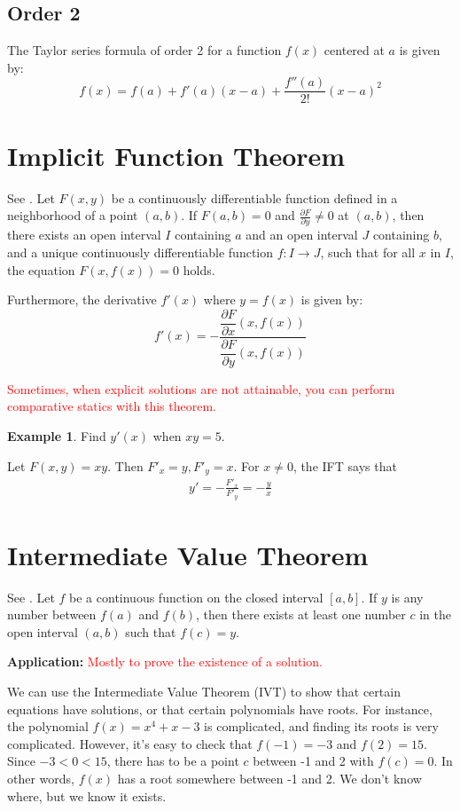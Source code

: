 \documentclass[11pt,a4paper]{book}
\newcommand{\red}[1]{\textcolor{red}{#1}}
\theoremstyle{definition}\newtheorem{definition}{Definition}
\theoremstyle{definition}\newtheorem{fact}{Fact}
\theoremstyle{definition}\newtheorem{remark}{Remark}
\theoremstyle{definition}\newtheorem{ex}{Ex.}
\theoremstyle{definition}\newtheorem{project}{Project}
\theoremstyle{definition}\newtheorem{problem}{Problem}
\theoremstyle{definition}\newtheorem{example}{Example}
\numberwithin{theorem}{section}
\numberwithin{corollary}{chapter}
\numberwithin{assumption}{chapter}
\numberwithin{definition}{chapter}
\numberwithin{prop}{chapter}
\numberwithin{notation}{chapter}
\numberwithin{problem}{chapter}
\numberwithin{example}{chapter}
\numberwithin{fact}{chapter}
\numberwithin{ex}{chapter}
\begin{document}
\begin{appendices}
	\subsection*{Order 2}
	The Taylor series formula of order 2 for a function $f(x)$ centered at $a$ is given by:
	\[
	f(x) = f(a) + f'(a)(x - a) + \frac{f''(a)}{2!}(x - a)^2
	\]
	
	\section{Implicit Function Theorem}
	See \citet[Ch 10.6]{springcamp}. Let \( F(x, y) \) be a continuously differentiable function defined in a neighborhood of a point \( (a, b) \). If \( F(a, b) = 0 \) and \( \frac{\partial F}{\partial y} \neq 0 \) at \( (a, b) \), then there exists an open interval \( I \) containing \( a \) and an open interval \( J \) containing \( b \), and a unique continuously differentiable function \( f : I \to J \), such that for all \( x \) in \( I \), the equation \( F(x, f(x)) = 0 \) holds.
	
	Furthermore, the derivative \( f'(x) \) where $y = f(x)$ is given by:
	\[ f'(x) = -\dfrac{\dfrac{\partial F}{\partial x}(x, f(x))}{\dfrac{\partial F}{\partial y}(x, f(x))} \]
	
	\red{Sometimes, when explicit solutions are not attainable, you can perform comparative statics with this theorem.} 	
	\begin{example}
		Find $y'(x)$ when $xy=5$.
		
		Let $F(x,y) = xy$. Then $F'_x = y, F'_y = x$. For $x\neq 0$, the IFT says that
		\begin{align*}
			y' = - \frac{F'_x}{F'_y} = - \frac{y}{x} 
		\end{align*}
	\end{example}
	
	
	\section{Intermediate Value Theorem}
	See \citet[Ch 6.10]{springcamp}. Let \( f \) be a continuous function on the closed interval \([a, b]\). If \( y \) is any number between \( f(a) \) and \( f(b) \), then there exists at least one number \( c \) in the open interval \((a, b)\) such that \( f(c) = y \).
	
	\textbf{Application:} \red{Mostly to prove the existence of a solution.}
	
	We can use the Intermediate Value Theorem (IVT) to show that certain equations have solutions, or that certain polynomials have roots. For instance, the polynomial \( f(x) = x^4 + x - 3 \) is complicated, and finding its roots is very complicated. However, it's easy to check that \( f(-1) = -3 \) and \( f(2) = 15 \). Since \( -3 < 0 < 15 \), there has to be a point \( c \) between -1 and 2 with \( f(c) = 0 \). In other words, \( f(x) \) has a root somewhere between -1 and 2. We don't know where, but we know it exists.
	

\end{appendices}
\end{document}
